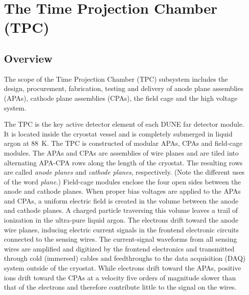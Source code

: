 
\section{The Time Projection Chamber (TPC)} 
\label{sec:detectors-fd-ref-tpc}

\subsection{Overview}

The scope of the Time Projection Chamber (TPC) subsystem includes the
design, procurement, fabrication, testing and delivery of anode plane
assemblies (APAs), cathode plane assemblies (CPAs), the field cage and
the high voltage system.

The TPC is the key active detector element of each DUNE
far detector module. It is located inside the cryostat vessel and is
completely submerged in liquid argon at 88~K. 
The TPC is constructed of modular APAs, CPAs and field-cage modules. The APAs and CPAs are assemblies of
wire planes and are tiled into alternating APA-CPA rows along the length of
the cryostat. The resulting rows are called \textit{anode planes} and \textit{cathode planes}, respectively.
(Note the different uses of the word \textit{plane}.)  Field-cage modules enclose the four open sides between
the anode and cathode planes.  
%
When proper bias voltages are applied
to the APAs and CPAs, a uniform electric field is created in the volume
between the anode and cathode planes. A charged particle traversing
this volume leaves a trail of ionization in the ultra-pure liquid
argon.  The electrons drift toward the anode wire planes, inducing
electric current signals in the frontend electronic circuits
connected to the sensing wires.  The current-signal waveforms from all
sensing wires are amplified and digitized by the frontend electronics
and transmitted through cold (immersed) cables and feedthroughs to the data
acquisition (DAQ) system outside of the cryostat. While electrons drift
toward the APAs, positive ions drift toward the CPAs at a velocity five orders of 
magnitude slower than that of the electrons and therefore contribute little to the signal on the wires.  



